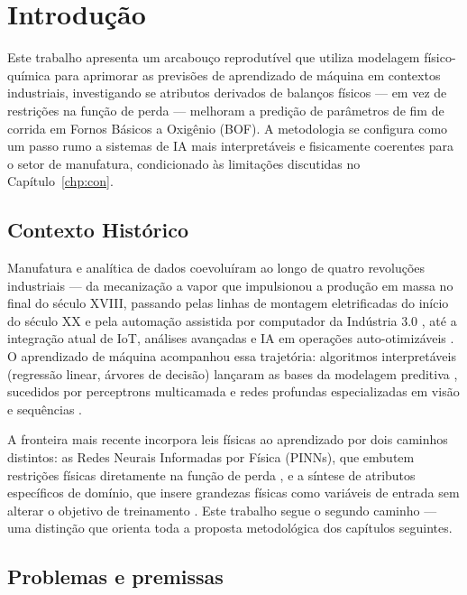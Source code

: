 \chapter{Introdução}
\label{chp:capitulo1}

Este trabalho apresenta um arcabouço reprodutível que utiliza modelagem físico-química para aprimorar as previsões de aprendizado de máquina em contextos industriais, investigando se atributos derivados de balanços físicos — em vez de restrições na função de perda — melhoram a predição de parâmetros de fim de corrida em Fornos Básicos a Oxigênio (BOF). A metodologia se configura como um passo rumo a sistemas de IA mais interpretáveis e fisicamente coerentes para o setor de manufatura, condicionado às limitações discutidas no Capítulo~\ref{chp:con}.

\section{Contexto Histórico}
\label{sec:contexto-historico}

Manufatura e analítica de dados coevoluíram ao longo de quatro revoluções industriais — da mecanização a vapor que impulsionou a produção em massa no final do século XVIII, passando pelas linhas de montagem eletrificadas do início do século XX \cite{lasi2014industry} e pela automação assistida por computador da Indústria 3.0 \cite{hermann2016industrie4}, até a integração atual de IoT, análises avançadas e IA em operações auto-otimizáveis \cite{schwab2017fourth,lu2017industry}. O aprendizado de máquina acompanhou essa trajetória: algoritmos interpretáveis (regressão linear, árvores de decisão) lançaram as bases da modelagem preditiva \cite{kuhn2013applied}, sucedidos por perceptrons multicamada e redes profundas especializadas em visão e sequências \cite{jordan2015ml}.

A fronteira mais recente incorpora leis físicas ao aprendizado por dois caminhos distintos: as Redes Neurais Informadas por Física (PINNs), que embutem restrições físicas diretamente na função de perda \cite{raissi2019pinns,cuomo2022physics}, e a síntese de atributos específicos de domínio, que insere grandezas físicas como variáveis de entrada sem alterar o objetivo de treinamento \cite{willard2020integrating,brunton2020machine}. Este trabalho segue o segundo caminho — uma distinção que orienta toda a proposta metodológica dos capítulos seguintes.

\section{Problemas e premissas}
\label{sub:prob}

